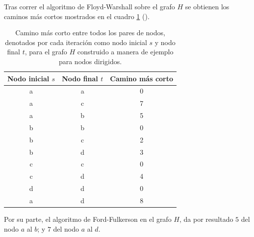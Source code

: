 \documentclass{article}
\begin{document}
  Tras correr el algoritmo de Floyd-Warshall sobre el grafo $H$ se obtienen los caminos más cortos mostrados en el cuadro \ref{cuadro:floyd-ejemploDirigido} (\pageref{cuadro:floyd-ejemploDirigido}).

  \begin{table}[]
  \centering
  \caption{Camino más corto entre todos los pares de nodos, denotados por cada iteración como nodo inicial $s$ y nodo final $t$, para el grafo $H$ construido a manera de ejemplo para nodos dirigidos.}
  \label{cuadro:floyd-ejemploDirigido}
  \begin{tabular}{@{}ccc@{}}
  \toprule
  \textbf{Nodo inicial $s$} & \textbf{Nodo final $t$} & \textbf{Camino más corto} \\ \midrule
  a & a & 0 \\ \midrule
  a & c & 7 \\ \midrule
  a & b & 5 \\ \midrule
  b & b & 0 \\ \midrule
  b & c & 2 \\ \midrule
  b & d & 3 \\ \midrule
  c & c & 0 \\ \midrule
  c & d & 4 \\ \midrule
  d & d & 0 \\ \midrule
  a & d & 8 \\ \bottomrule
  \end{tabular}
  \end{table}

  Por su parte, el algoritmo de Ford-Fulkerson en el grafo $H$, da por resultado $5$ del nodo $a$ al $b$; y $7$ del nodo $a$ al $d$.

\end{document}
